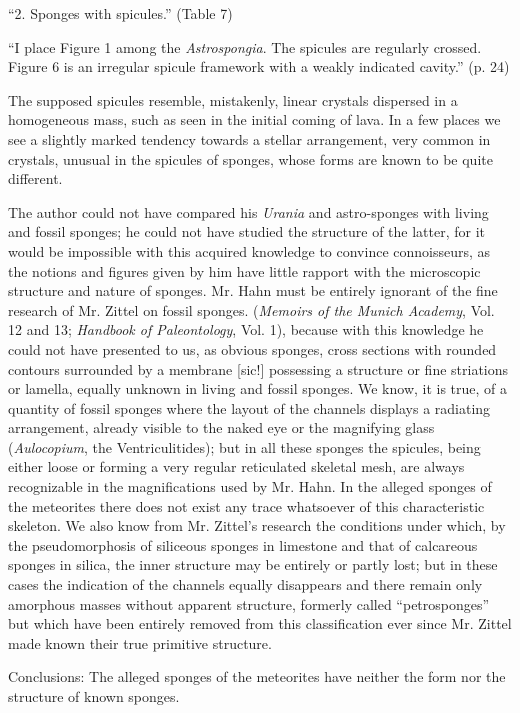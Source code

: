 \documentclass[a4paper, 12pt, oneside]{article}
\begin{document}
``2. Sponges with spicules.'' (Table 7)

``I place Figure 1 among the \emph{Astrospongia}. The spicules are regularly crossed. Figure 6 is an irregular spicule framework with a weakly indicated cavity.'' (p. 24)

The supposed spicules resemble, mistakenly, linear crystals dispersed in a homogeneous mass, such as seen in the initial coming of lava. In a few places we see a slightly marked tendency towards a stellar arrangement, very common in crystals, unusual in the spicules of sponges, whose forms are known to be quite different.

The author could not have compared his \emph{Urania} and astro-sponges with living and fossil sponges; he could not have studied the structure of the latter, for it would be impossible with this acquired knowledge to convince connoisseurs, as the notions and figures given by him have little rapport with the microscopic structure and nature of sponges. Mr. Hahn must be entirely ignorant of the fine research of Mr. Zittel on fossil sponges. (\emph{Memoirs of the Munich Academy}, Vol. 12 and 13; \emph{Handbook of Paleontology}, Vol. 1), because with this knowledge he could not have presented to us, as obvious sponges, cross sections with rounded contours surrounded by a membrane [sic!] possessing a structure or fine striations or lamella, equally unknown in living and fossil sponges. We know, it is true, of a quantity of fossil sponges where the layout of the channels displays a radiating arrangement, already visible to the naked eye or the magnifying glass (\emph{Aulocopium}, the Ventriculitides); but in all these sponges the spicules, being either loose or forming a very regular reticulated skeletal mesh, are always recognizable in the magnifications used by Mr. Hahn. In the alleged sponges of the meteorites there does not exist any trace whatsoever of this characteristic skeleton. We also know from Mr. Zittel's research the conditions under which, by the pseudomorphosis of siliceous sponges in limestone and that of calcareous sponges in silica, the inner structure may be entirely or partly lost; but in these cases the indication of the channels equally disappears and there remain only amorphous masses without apparent structure, formerly called ``petrosponges'' but which have been entirely removed from this classification ever since Mr. Zittel made known their true primitive structure.

Conclusions: The alleged sponges of the meteorites have neither the form nor the structure of known sponges.
\end{document}
